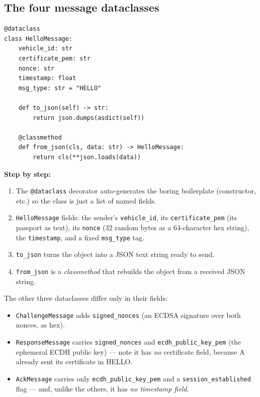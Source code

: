 \documentclass[11pt,a4paper]{article}
\begin{document}
\subsection{The four message dataclasses}
\begin{lstlisting}[style=py,caption={auth\_protocol.py --- the HELLO message (the
other three messages follow the same pattern).}]
@dataclass
class HelloMessage:
    vehicle_id: str
    certificate_pem: str
    nonce: str
    timestamp: float
    msg_type: str = "HELLO"

    def to_json(self) -> str:
        return json.dumps(asdict(self))

    @classmethod
    def from_json(cls, data: str) -> HelloMessage:
        return cls(**json.loads(data))
\end{lstlisting}
\textbf{Step by step:}
\begin{enumerate}
  \item The \texttt{@dataclass} decorator auto-generates the boring boilerplate
        (constructor, etc.) so the class is just a list of named fields.
  \item \texttt{HelloMessage} fields: the sender's \texttt{vehicle\_id}, its
        \texttt{certificate\_pem} (its passport as text), its \texttt{nonce}
        (32 random bytes as a 64-character hex string), the \texttt{timestamp},
        and a fixed \texttt{msg\_type} tag.
  \item \texttt{to\_json} turns the object into a JSON text string ready to send.
  \item \texttt{from\_json} is a \emph{classmethod} that rebuilds the object from
        a received JSON string.
\end{enumerate}
The other three dataclasses differ only in their fields:
\begin{itemize}
  \item \texttt{ChallengeMessage} adds \texttt{signed\_nonces} (an ECDSA
        signature over both nonces, as hex).
  \item \texttt{ResponseMessage} carries \texttt{signed\_nonces} and
        \texttt{ecdh\_public\_key\_pem} (the ephemeral ECDH public key) ---
        note it has \emph{no} certificate field, because A already sent its
        certificate in HELLO.
  \item \texttt{AckMessage} carries only \texttt{ecdh\_public\_key\_pem} and a
        \texttt{session\_established} flag --- and, unlike the others, it has
        \emph{no timestamp field}.
\end{itemize}
\end{document}
